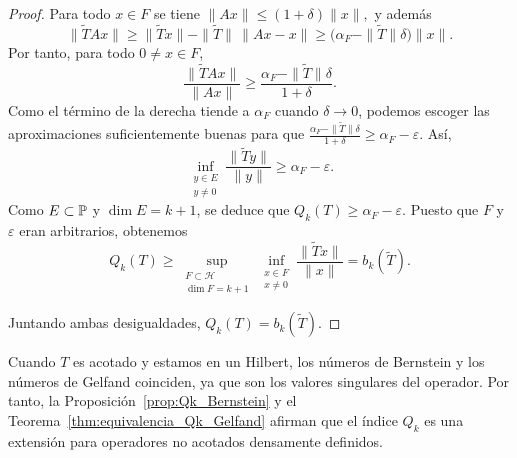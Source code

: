 \begin{proof}
	Para todo $x\in F$ se tiene
	\(
	\|Ax\|\le (1+\delta)\|x\|,
	\)
	y además
	\[
		\|\widetilde T Ax\|
		\ge
		\|\widetilde T x\|-\|\widetilde T\|\,\|Ax-x\|
		\ge
		\bigl(\alpha_F-\|\widetilde T\|\delta\bigr)\|x\|.
	\]
	Por tanto, para todo $0\ne x\in F$,
	\[
		\frac{\|\widetilde T Ax\|}{\|Ax\|}
		\ge
		\frac{\alpha_F-\|\widetilde T\|\delta}{1+\delta}.
	\]
	Como el término de la derecha tiende a $\alpha_F$ cuando $\delta\to0$, podemos escoger las aproximaciones suficientemente buenas para que \(\frac{\alpha_F-\|\widetilde T\|\delta}{1+\delta} \ge \alpha_F-\varepsilon\).
	Así,
	\[
		\inf_{\substack{y\in E\\ y\ne0}}
		\frac{\|\widetilde T y\|}{\|y\|}
		\ge
		\alpha_F-\varepsilon.
	\]
	Como $E\subset\mathbb{P}$ y $\dim E=k+1$, se deduce que \(Q_k(T)\ge \alpha_F-\varepsilon\).
	Puesto que $F$ y $\varepsilon$ eran arbitrarios, obtenemos
	\[
		Q_k(T)\ge
		\sup_{\substack{F\subset\mathcal H\\ \dim F=k+1}}
		\inf_{\substack{x\in F\\ x\ne0}}
		\frac{\|\widetilde T x\|}{\|x\|}
		=
		b_k(\widetilde T).
	\]

	Juntando ambas desigualdades, \(Q_k(T)=b_k(\widetilde T)\).
\end{proof}

\begin{rmk}
	Cuando $T$ es acotado y estamos en un Hilbert, los números de Bernstein y los números de Gelfand coinciden, ya que son los valores singulares del operador. Por tanto, la Proposición~\ref{prop:Qk_Bernstein} y el Teorema~\ref{thm:equivalencia_Qk_Gelfand} afirman que el índice $Q_k$ es una extensión para operadores no acotados densamente definidos.
\end{rmk}
